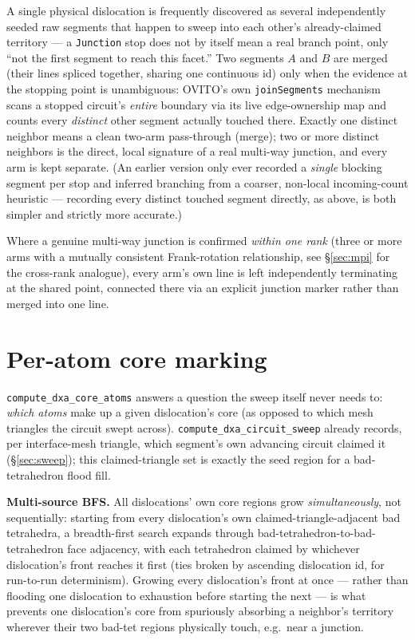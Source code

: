 \documentclass[11pt,a4paper]{article}
\newcommand{\op}[1]{\texttt{#1}}
\newcommand{\code}[1]{\texttt{#1}}
\begin{document}
A single physical dislocation is frequently discovered as several independently seeded raw
segments that happen to sweep into each other's already-claimed territory — a \code{Junction} stop
does not by itself mean a real branch point, only ``not the first segment to reach this facet.''
Two segments $A$ and $B$ are merged (their lines spliced together, sharing one continuous id) only
when the evidence at the stopping point is unambiguous: OVITO's own \code{joinSegments} mechanism
scans a stopped circuit's \emph{entire} boundary via its live edge-ownership map and counts every
\emph{distinct} other segment actually touched there. Exactly one distinct neighbor means a clean
two-arm pass-through (merge); two or more distinct neighbors is the direct, local signature of a
real multi-way junction, and every arm is kept separate. (An earlier version only ever recorded a
\emph{single} blocking segment per stop and inferred branching from a coarser, non-local
incoming-count heuristic — recording every distinct touched segment directly, as above, is both
simpler and strictly more accurate.)

Where a genuine multi-way junction is confirmed \emph{within one rank} (three or more arms with a
mutually consistent Frank-rotation relationship, see \S\ref{sec:mpi} for the cross-rank analogue),
every arm's own line is left independently terminating at the shared point, connected there via an
explicit junction marker rather than merged into one line.

\section{Per-atom core marking}
\label{sec:core-atoms}

\op{compute\_dxa\_core\_atoms} answers a question the sweep itself never needs to: \emph{which
atoms} make up a given dislocation's core (as opposed to which mesh triangles the circuit swept
across). \op{compute\_dxa\_circuit\_sweep} already records, per interface-mesh triangle, which
segment's own advancing circuit claimed it (\S\ref{sec:sweep}); this claimed-triangle set is
exactly the seed region for a bad-tetrahedron flood fill.

\textbf{Multi-source BFS.} All dislocations' own core regions grow \emph{simultaneously}, not
sequentially: starting from every dislocation's own claimed-triangle-adjacent bad tetrahedra, a
breadth-first search expands through bad-tetrahedron-to-bad-tetrahedron face adjacency, with each
tetrahedron claimed by whichever dislocation's front reaches it first (ties broken by ascending
dislocation id, for run-to-run determinism). Growing every dislocation's front at once — rather
than flooding one dislocation to exhaustion before starting the next — is what prevents one
dislocation's core from spuriously absorbing a neighbor's territory wherever their two bad-tet
regions physically touch, e.g.\ near a junction.
\end{document}

